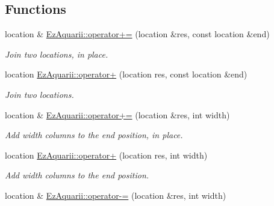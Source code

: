 \subsection*{Functions}
\begin{DoxyCompactItemize}
\item 
location \& \hyperlink{location_8hh_a4761fc9581370c6b8e5b5f0b0aa0e44a}{Ez\+Aquarii\+::operator+=} (location \&res, const location \&end)\hypertarget{location_8hh_a4761fc9581370c6b8e5b5f0b0aa0e44a}{}\label{location_8hh_a4761fc9581370c6b8e5b5f0b0aa0e44a}

\begin{DoxyCompactList}\small\item\em Join two locations, in place. \end{DoxyCompactList}\item 
location \hyperlink{location_8hh_a4e68f52c63c1afac1f05c8ec766b98a7}{Ez\+Aquarii\+::operator+} (location res, const location \&end)\hypertarget{location_8hh_a4e68f52c63c1afac1f05c8ec766b98a7}{}\label{location_8hh_a4e68f52c63c1afac1f05c8ec766b98a7}

\begin{DoxyCompactList}\small\item\em Join two locations. \end{DoxyCompactList}\item 
location \& \hyperlink{location_8hh_aead12738741320a9d5bd832561a47303}{Ez\+Aquarii\+::operator+=} (location \&res, int width)\hypertarget{location_8hh_aead12738741320a9d5bd832561a47303}{}\label{location_8hh_aead12738741320a9d5bd832561a47303}

\begin{DoxyCompactList}\small\item\em Add {\itshape width} columns to the end position, in place. \end{DoxyCompactList}\item 
location \hyperlink{location_8hh_a483cb426df64b2c455ea7bde49c4c828}{Ez\+Aquarii\+::operator+} (location res, int width)\hypertarget{location_8hh_a483cb426df64b2c455ea7bde49c4c828}{}\label{location_8hh_a483cb426df64b2c455ea7bde49c4c828}

\begin{DoxyCompactList}\small\item\em Add {\itshape width} columns to the end position. \end{DoxyCompactList}\item 
location \& \hyperlink{location_8hh_ab194291e90f2358399ea16ccc39a4615}{Ez\+Aquarii\+::operator-\/=} (location \&res, int width)\hypertarget{location_8hh_ab194291e90f2358399ea16ccc39a4615}{}\label{location_8hh_ab194291e90f2358399ea16ccc39a4615}


\end{DoxyCompactItemize}
